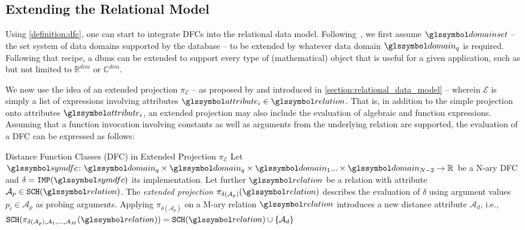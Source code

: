 \subsection{Extending the Relational Model}

Using \cref{definition:dfc}, one can start to integrate DFCs into the relational data model. Following~\cite{Giangreco:2018thesis}, we first assume  $\domainset$ -- the set system of data domains supported by the database -- to be extended by whatever data domain $\domain_q$ is required. Following that recipe, a \acrshort{dbms} can be extended to support every type of (mathematical) object that is useful for a given application, such as but not limited to $\mathbb{R}^{dim}$ or $\mathbb{C}^{dim}$. 

We now use the idea of an extended projection $\pi_{\mathcal{E}}$ -- as proposed by \cite{Gupta:1995Generalized,Garcia:2009Database} and introduced in \cref{section:relational_data_model} -- wherein $\mathcal{E}$ is simply a list of expressions involving attributes $\attribute_i \in \relation$. That is, in addition to the simple projection onto attributes $\attribute_i$, an extended projection may also include the evaluation of algebraic and function expressions. Assuming that a function invocation involving constants as well as arguments from the underlying relation are supported, the evaluation of a DFC can be expressed as follows:

\begin{definition}[label=definition:spf_rel]{Distance Function Classes (DFC) in Extended Projection $\pi_{\mathcal{E}}$}{}
    Let $\symdfc \colon \domain_q \times \domain_q \times \domain_{1} ... \times \domain_{N-2} \to \mathbb{R}$ be a N-ary DFC and $\delta = \mathtt{IMP}(\symdfc)$ its implementation. Let further $\relation$ be a relation with attribute $\mathcal{A}_p \in \mathtt{SCH}(\relation)$. The \emph{extended projection} $\pi_{\delta(\mathcal{A}_p)}(\relation)$ describes the evaluation of $\delta$ using argument values $p_{i} \in \mathcal{A}_p$ as probing arguments. Applying $\pi_{\delta(\mathcal{A}_p)}$ on a M-ary relation $\relation$ introduces a new distance attribute $\mathcal{A}_d$, i.e., $\mathtt{SCH}(\pi_{\delta(\mathcal{A}_p), \mathcal{A}_1, ..., \mathcal{A}_M}(\relation)) = \mathtt{SCH}(\relation) \cup \{ \mathcal{A}_d \}$
\end{definition}

